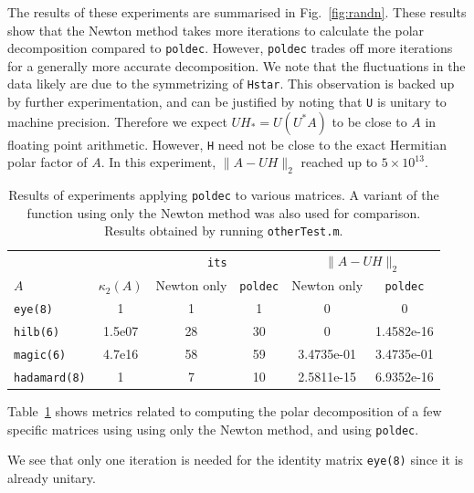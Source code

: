 \documentclass[10pt, A4paper]{article}
\begin{document}
The results of these experiments are summarised in Fig.~\ref{fig:randn}.
These results show that the Newton method takes more iterations to 
calculate the polar decomposition compared to \texttt{poldec}.
However, \texttt{poldec} trades off more iterations for a generally 
more accurate decomposition.
We note that the fluctuations in the data likely are due to the 
symmetrizing of \texttt{Hstar}.
This observation is backed up by further experimentation, and can be 
justified by noting that \texttt{U} is unitary to machine precision.
Therefore we expect $UH_* = U(U^*A)$ to be close to $A$ in floating 
point arithmetic.
However, \texttt{H} need not be close to the exact Hermitian 
polar factor of $A$. In this experiment, $\|A - UH\|_2$ reached up to 
$5 \times 10^{13}$.

\begin{table}[t]
	\centering
	\begin{tabular}{ l c c c c c }
		\toprule
		& & \multicolumn{2}{c}{\texttt{its}} & 
		\multicolumn{2}{c}{$\|A-UH\|_2$} \\
		\cmidrule(lr){3-4} \cmidrule(lr{12pt}){5-6}
		$A$ & $\kappa_2(A)$ & Newton only & \texttt{poldec} & Newton only 
		& 
		\texttt{poldec} \\
		\midrule
		\texttt{eye(8)}      & 1      & 1  & 1  & 0          
		                                              & 0 \\
		\texttt{hilb(6)}     & 1.5e07 & 28 & 30 & 0          
		                                              & 1.4582e-16 \\
		\texttt{magic(6)}    & 4.7e16 & 58 & 59 & 3.4735e-01 
		                                              &	3.4735e-01 \\
		\texttt{hadamard(8)} & 1      & 7  & 10 & 2.5811e-15 
		                                              & 6.9352e-16 \\
		\bottomrule
	\end{tabular}
	\caption{
	Results of experiments applying \texttt{poldec} 
	to	various matrices. A variant of the function using only the 
	Newton method was also used for comparison. Results obtained by 
	running \texttt{otherTest.m}.
	\label{tab:poldecresults}}
\end{table}

Table~\ref{tab:poldecresults} shows metrics related to computing the 
polar decomposition of a few specific matrices using using only the 
Newton method, and using \texttt{poldec}.

We see that only one iteration is needed for the identity matrix 
\texttt{eye(8)} since it is already unitary.
\end{document}
